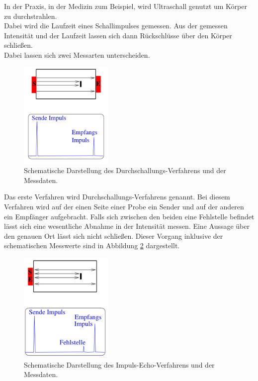 \noindent
In der Praxis, in der Medizin zum Beispiel, wird Ultraschall genutzt um Körper zu durchstrahlen.\\
Dabei wird die Laufzeit eines Schallimpulses gemessen. Aus der gemessen Intensität und der Laufzeit lassen sich dann Rückschlüsse über den Körper schließen.\\
Dabei lassen sich zwei Messarten unterscheiden.
\begin{figure}[H]
    \centering
    \includegraphics[width=0.4\textwidth]{latex/images/durchschall.PNG}
    \caption{Schematische Darstellung des Durchschallungs-Verfahrens und der Messdaten\protect \cite{US1}.}
    \label{img:durch}
\end{figure}

\noindent
Das erste Verfahren wird Durchschallungs-Verfahrens genannt.
Bei diesem Verfahren wird auf der einen Seite einer Probe ein Sender und auf der anderen ein Empfänger aufgebracht.
Falls sich zwischen den beiden eine Fehlstelle befindet lässt sich eine wesentliche Abnahme in der Intensität messen.
Eine Aussage über den genauen Ort lässt sich nicht schließen. 
Dieser Vorgang inklusive der schematischen Messwerte sind in Abbildung \ref{img:durch} dargestellt.

\begin{figure}[H]
    \centering
    \includegraphics[width=0.4\textwidth]{latex/images/echo.PNG}
    \caption{Schematische Darstellung des Impuls-Echo-Verfahrens und der Messdaten\protect \cite{US1}.}
    \label{img:durch}
\end{figure}


